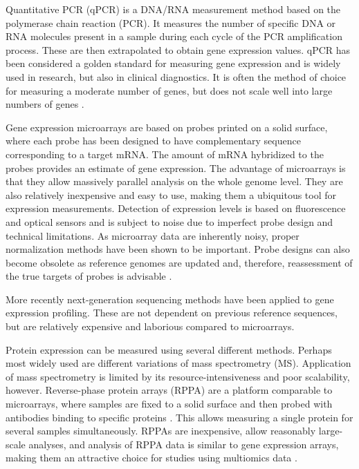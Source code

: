 Quantitative PCR (qPCR) is a DNA/RNA measurement method based on the
polymerase chain reaction (PCR). It measures the number of specific DNA or RNA
molecules present in a sample during each cycle of the PCR amplification
process. These are then extrapolated to obtain gene expression values. qPCR
has been considered a golden standard for measuring gene expression and is
widely used in research, but also in clinical diagnostics. It is often the
method of choice for measuring a moderate number of genes, but does not scale
well into large numbers of genes \citep{VanGuilder2008}.

Gene expression microarrays are based on probes printed on a solid surface,
where each probe has been designed to have complementary sequence
corresponding to a target mRNA. The amount of mRNA hybridized to the probes
provides an estimate of gene expression. The advantage of microarrays is that
they allow massively parallel analysis on the whole genome level. They are
also relatively inexpensive and easy to use, making them a ubiquitous tool for
expression measurements. Detection of expression levels is based on
fluorescence and optical sensors and is subject to noise due to imperfect
probe design and technical limitations. As microarray data are inherently
noisy, proper normalization methods have been shown to be important. Probe
designs can also become obsolete as reference genomes are updated and,
therefore, reassessment of the true targets of probes is advisable
\citep{Allison2006}.

More recently next-generation sequencing methods have been applied to gene
expression profiling. These are not dependent on previous reference sequences,
but are relatively expensive and laborious compared to microarrays.

Protein expression can be measured using several different methods. Perhaps
most widely used are different variations of mass spectrometry (MS).
Application of mass spectrometry is limited by its resource-intensiveness and
poor scalability, however. Reverse-phase protein arrays (RPPA) are a platform
comparable to microarrays, where samples are fixed to a solid surface and then
probed with antibodies binding to specific proteins \citep{Charboneau2002}.
This allows measuring a single protein for several samples simultaneously.
RPPAs are inexpensive, allow reasonably large-scale analyses, and analysis of
RPPA data is similar to gene expression arrays, making them an attractive
choice for studies using multiomics data \citep{Mannsperger2010}.

